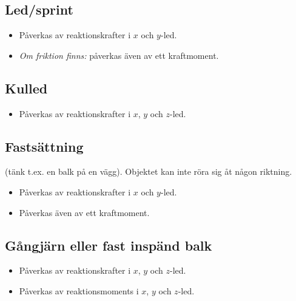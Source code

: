 \documentclass{article}
\newenvironment{ankiflashcard}[1]{}{}
\begin{document}
\begin{paracol}{2}
\begin{ankiflashcard}{Vilka reaktionskrafter påverkas en led/en sprint av}
\subsection{Led/sprint}
\begin{itemize}
    \item Påverkas av reaktionskrafter i $x$ och $y$-led.
    \item \textit{Om friktion finns:} påverkas även av ett kraftmoment.
\end{itemize}
\end{ankiflashcard}

\begin{ankiflashcard}{Vilka reaktionskrafter påverkas en kulled av?}
    
\subsection{Kulled}

\begin{itemize}
    \item Påverkas av reaktionskrafter i $x$, $y$ och $z$-led.
\end{itemize}
\end{ankiflashcard}

\begin{ankiflashcard}{Vilka reaktionskrafter påverkas ett fastsatt objekt av?}
\subsection{Fastsättning}
(tänk t.ex. en balk på en vägg). Objektet kan inte röra sig åt någon riktning.
\begin{itemize}
    \item Påverkas av reaktionskrafter i $x$ och $y$-led.
    \item Påverkas även av ett kraftmoment.
\end{itemize}
\end{ankiflashcard}

\begin{ankiflashcard}{Vilka reaktionskrafter påverkas ett gångjärn av?}
    
\subsection{Gångjärn eller fast inspänd balk}
\begin{itemize}
    \item Påverkas av reaktionskrafter i $x$, $y$ och $z$-led.
    \item Påverkas av reaktionsmoments i $x$, $y$ och $z$-led.
\end{itemize}
\end{ankiflashcard}
\end{paracol}
\end{document}
